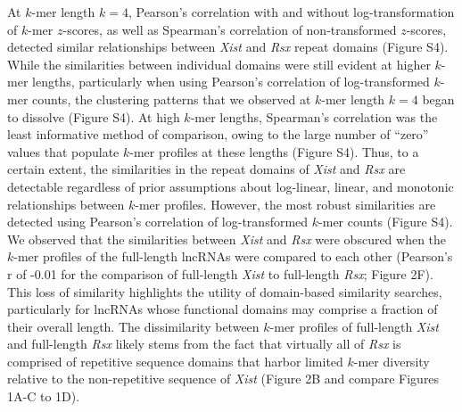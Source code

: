 At $k$-mer length $k = 4$, Pearson’s correlation with and without log-transformation of $k$-mer $z$-scores, as well as Spearman’s correlation of non-transformed $z$-scores, detected similar relationships between \emph{Xist} and \emph{Rsx} repeat domains (Figure S4). While the similarities between individual domains were still evident at higher $k$-mer lengths, particularly when using Pearson’s correlation of log-transformed $k$-mer counts, the clustering patterns that we observed at $k$-mer length $k = 4$ began to dissolve (Figure S4). At high $k$-mer lengths, Spearman’s correlation was the least informative method of comparison, owing to the large number of ``zero” values that populate $k$-mer profiles at these lengths (Figure S4). Thus, to a certain extent, the similarities in the repeat domains of \emph{Xist} and \emph{Rsx} are detectable regardless of prior assumptions about log-linear, linear, and monotonic relationships between $k$-mer profiles. However, the most robust similarities are detected using Pearson’s correlation of log-transformed $k$-mer counts (Figure S4).
We observed that the similarities between \emph{Xist} and \emph{Rsx} were obscured when the $k$-mer profiles of the full-length lncRNAs were compared to each other (Pearson’s r of -0.01 for the comparison of full-length \emph{Xist} to full-length \emph{Rsx}; Figure 2F). This loss of similarity highlights the utility of domain-based similarity searches, particularly for lncRNAs whose functional domains may comprise a fraction of their overall length. The dissimilarity between $k$-mer profiles of full-length \emph{Xist} and full-length \emph{Rsx} likely stems from the fact that virtually all of \emph{Rsx} is comprised of repetitive sequence domains that harbor limited $k$-mer diversity relative to the non-repetitive sequence of \emph{Xist} (Figure 2B and compare Figures 1A-C to 1D). 

